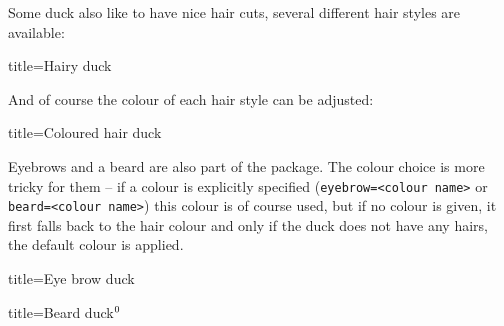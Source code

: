 \documentclass[parskip=half]{scrartcl}
\begin{document}
Some duck also like to have nice hair cuts, several different hair styles are available:
\begin{tcblisting}{title={Hairy duck}}
\begin{tikzpicture}
	\duck[longhair]
\end{tikzpicture}
\begin{tikzpicture}
	\duck[shorthair]
\end{tikzpicture}

\begin{tikzpicture}
	\duck[crazyhair]
\end{tikzpicture}
\begin{tikzpicture}
	\duck[recedinghair]
\end{tikzpicture}
\end{tcblisting}

And of course the colour of each hair style can be adjusted:
\begin{tcblisting}{title={Coloured hair duck}}
\begin{tikzpicture}
	\duck[longhair=teal]
\end{tikzpicture}
\end{tcblisting}

Eyebrows and a beard are also part of the package. The colour choice is more tricky for them -- if a colour is explicitly specified (\lstinline|eyebrow=<colour name>| or \lstinline|beard=<colour name>|) this colour is of course used, but if no colour is given, it first falls back to the hair colour and only if the duck does not have any hairs, the default colour is applied.

\begin{tcblisting}{title={Eye brow duck}}
\begin{tikzpicture}
	\duck[eyebrow]
\end{tikzpicture}
\begin{tikzpicture}
	\duck[longhair=blue, 
		eyebrow]
\end{tikzpicture}

\begin{tikzpicture}
	\duck[crazyhair=red, 
		eyebrow=blue]
\end{tikzpicture}
\end{tcblisting}

\addtocounter{footnote}{1}
\begin{tcblisting}{title={Beard duck$^\thefootnote$}}
\begin{tikzpicture}
	\duck[beard=white!80!brown]
\end{tikzpicture}
\begin{tikzpicture}
	\duck[recedinghair=white,beard]
\end{tikzpicture}
\end{tcblisting}
\end{document}
